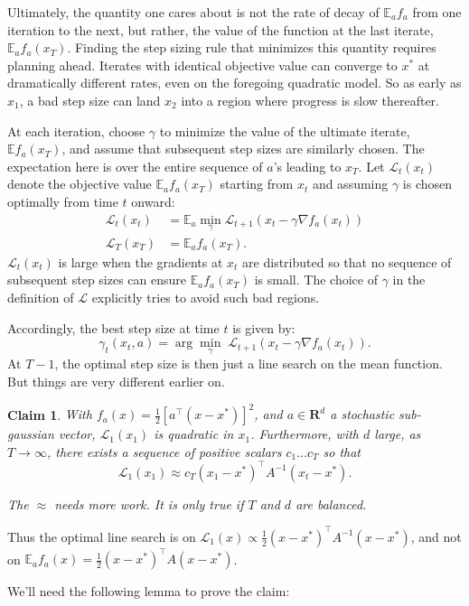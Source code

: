 \documentclass{article}
\newtheorem{claim}{Claim}
\newcommand{\half}{\tfrac{1}{2}}
\newcommand{\E}{\mathbb{E}}
\renewcommand{\L}{\mathcal{L}}
\newcommand{\R}{\mathbf{R}}
\begin{document}
Ultimately, the quantity one cares about is not the rate of decay of $\E_a f_a$ from one iteration to the next, but rather, the value of the function at the last iterate, $\E_a f_a(x_T)$.  Finding the step sizing rule that minimizes this quantity requires planning ahead. Iterates with identical objective value can converge to $x^*$ at dramatically different rates, even on the foregoing quadratic model. So as early as $x_1$, a bad step size can land $x_2$ into a region where progress is slow thereafter.

At each iteration, choose $\gamma$ to minimize the value of the ultimate iterate, $\E f_a(x_T)$, and assume that subsequent step sizes are similarly chosen. The expectation here is over the entire sequence of $a$'s leading to $x_T$. Let $\L_t(x_t)$ denote the objective value $\E_a f_a(x_T)$ starting from $x_t$ and assuming $\gamma$ is chosen optimally from time $t$ onward:
\begin{align}
\L_t(x_t) &= \E_a \min_\gamma \label{eq:Lt} \L_{t+1}\left(x_t - \gamma \nabla f_a(x_t)\right) \\
\L_T(x_T) &= \E_a f_a(x_T).
\end{align}
$\L_t(x_t)$ is large when the gradients at $x_t$  are distributed so that no sequence of subsequent step sizes can ensure $\E_a f_a(x_T)$ is small. The choice of $\gamma$ in the definition of $\L$ explicitly tries to avoid such bad regions.

Accordingly, the best step size at time $t$ is given by:
$$\gamma_t(x_t,a) = \arg\min_\gamma\; \L_{t+1}(x_t - \gamma \nabla f_a(x_t)).$$
At $T-1$, the optimal step size is then just a line search on the mean function. But things are very different earlier on.


\begin{claim}\label{claim:main}
 With $f_a(x) = \half \left[a^\top (x-x^*)\right]^2$, and $a \in \R^d$ a stochastic sub-gaussian vector, $\L_1(x_1)$ is quadratic in $x_1$. Furthermore, with $d$ large, as $T\to \infty$, there exists a sequence of positive scalars $c_1\ldots c_T$ so that 
 $$\L_1(x_1) \approx c_T (x_1-x^*)^\top A^{-1} (x_t-x^*).$$
 
 The $\approx$ needs more work. It is only true if $T$ and $d$ are  balanced.
\end{claim}
Thus the optimal line search is on $\L_1(x) \propto \half (x-x^*)^\top A^{-1} (x-x^*)$, and not on $\E_a f_a(x) = \half (x-x^*)^\top A (x-x^*)$.

We'll need the following lemma to prove the claim:
\end{document}

